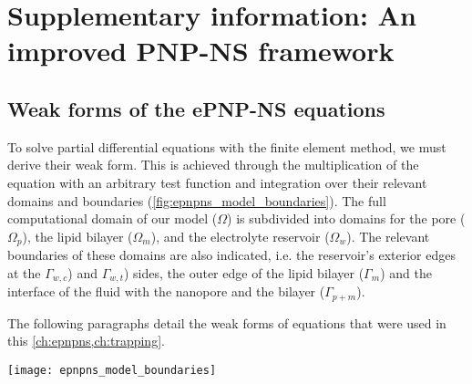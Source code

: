 %
\chapter[SI: An improved PNP-NS framework]%
        {Supplementary information: An improved PNP-NS framework}
%
\label{ch:epnpns_appendix}

\begin{shaded}
\newpage
\end{shaded}


\section{Weak forms of the {ePNP-NS} equations}
%
\label{sec:epnpns_appendix:weak_forms}
%

To solve partial differential equations with the finite element method, we must derive their weak form.
This is achieved through the multiplication of the equation with an arbitrary test function and integration over
their relevant domains and boundaries (\cref{fig:epnpns_model_boundaries}). The full computational domain of
our model ($\Omega$) is subdivided into domains for the pore ($\Omega_p$), the lipid bilayer ($\Omega_m$), and
the electrolyte reservoir ($\Omega_w$). The relevant boundaries of these domains are also indicated, i.e. the
reservoir's exterior edges at the \cisi{} $\Gamma_{w,c}$) and \transi{} $\Gamma_{w,t}$) sides, the outer edge
of the lipid bilayer ($\Gamma_{m}$) and the interface of the fluid with the nanopore and the bilayer
($\Gamma_{p+m}$).

The following paragraphs detail the weak forms of equations that were used in this
\cref{ch:epnpns,ch:trapping}.

%
\begin{figure*}[t]
  \centering
  \texttt{[image: epnpns\_model\_boundaries]}
  
  \caption[Computational domains and boundaries.]%
  {\textbf{Computational domains and boundaries.}
    The full computational domain ($\Omega$) of the model is subdivided into various subdomains---comprising
    the reservoir ($\Omega_w$), the lipid bilayer ($\Omega_m$) and the pore ($\Omega_p$)---and their limiting
    boundaries---the exterior boundary at the \cisi{} ($\Gamma_{w,c}$) \transi{} and the \transi{}
    ($\Gamma_{w,t}$) sides of the reservoir, the exterior boundary of the membrane ($\Gamma_m$) and the
    interior boundary between the reservoir on the one hand, and the pore and membrane on the other
    ($\Gamma_{p+m}$).
  }\label{fig:epnpns_model_boundaries}
\end{figure*}
%


